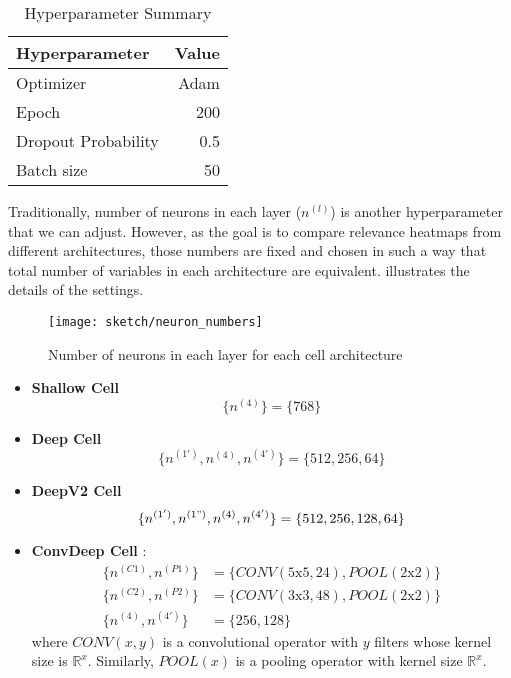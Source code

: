  
 \begin{table}[!htb]
\centering
\begin{tabular}{l|r}
\textbf{Hyperparameter} & \multicolumn{1}{l}{\textbf{Value}} \\ \hline
Optimizer               & Adam                               \\
Epoch     & 200                                \\
Dropout Probability     & 0.5                                \\
Batch size              & 50                                
\end{tabular}
\caption{Hyperparameter Summary}
\label{tab:hyper_summary}
\end{table}
 
Traditionally, number of neurons in each layer ($n^{(l)}$) is  another hyperparameter that we can adjust. However, as the goal is to compare relevance heatmaps from different architectures, those numbers are fixed and chosen in such a way that total number of variables in each architecture are equivalent. \addfigure{\ref{fig:neuron_numbers}} illustrates the details of the settings.

\begin{figure}[!htb]
\centering
\texttt{[image: sketch/neuron\_numbers]}
\caption{Number of neurons in each layer for each cell architecture}
\label{fig:neuron_numbers}
\end{figure}


\begin{itemize}
	\item \textbf{Shallow Cell} 
$$\{ n^{(4)}\} = \{ 768 \}$$
	\item \textbf{Deep Cell} 
$$\{ n^{(1')}, n^{(4)}, n^{(4')} \} = \{ 512, 256, 64 \}$$
	\item \textbf{DeepV2 Cell} 
$$\{ n^{(1')}, n^{(1")}, n^{(4)}, n^{(4')} \} = \{ 512, 256, 128, 64 \}$$
	\item \textbf{ConvDeep Cell} : 
\begin{align*}
	\{ n^{(C1)}, n^{(P1)} \} &= \{ CONV(5\text{x}5, 24), POOL(2\text{x}2) \} \\
		\{ n^{(C2)}, n^{(P2)} \} &= \{ CONV(3\text{x}3, 48), POOL(2\text{x}2) \} \\
			\{  n^{(4)}, n^{(4')} \} &= \{ 256, 128 \}
\end{align*}
where $CONV(x,y)$ is a convolutional operator with $y$ filters whose kernel size is $\mathbb{R}^{x}$. Similarly, $POOL(x)$ is a pooling operator  with kernel size $\mathbb{R}^{x}$.


\end{itemize}

